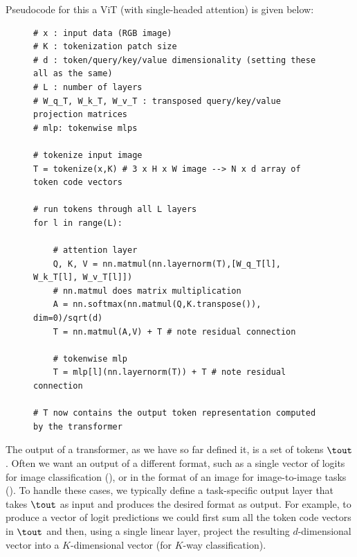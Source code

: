 Pseudocode for this a ViT (with single-headed attention) is given below:%
\begin{figure}[h]
    \begin{minipage}{1.0\linewidth}
        \begin{verbatim}
# x : input data (RGB image)
# K : tokenization patch size
# d : token/query/key/value dimensionality (setting these all as the same)
# L : number of layers
# W_q_T, W_k_T, W_v_T : transposed query/key/value projection matrices
# mlp: tokenwise mlps

# tokenize input image
T = tokenize(x,K) # 3 x H x W image --> N x d array of token code vectors

# run tokens through all L layers
for l in range(L):

    # attention layer
    Q, K, V = nn.matmul(nn.layernorm(T),[W_q_T[l], W_k_T[l], W_v_T[l]]) 
    # nn.matmul does matrix multiplication
    A = nn.softmax(nn.matmul(Q,K.transpose()), dim=0)/sqrt(d)
    T = nn.matmul(A,V) + T # note residual connection

    # tokenwise mlp
    T = mlp[l](nn.layernorm(T)) + T # note residual connection

# T now contains the output token representation computed by the transformer
\end{verbatim}
    \end{minipage}
\end{figure}

The output of a transformer, as we have so far defined it, is a set of tokens $\tout$. Often we want an output of a different format, such as a single vector of logits for image classification (\sect{\ref{sec:intro_to_learning:image_classification}}), or in the format of an image for image-to-image tasks (\sect{\ref{sec:conditional_generative_models:im2im}}). To handle these cases, we typically define a task-specific output layer that takes $\tout$ as input and produces the desired format as output. For example, to produce a vector of logit predictions we could first sum all the token code vectors in $\tout$ and then, using a single linear layer, project the resulting $d$-dimensional vector into a $K$-dimensional vector (for $K$-way classification).

